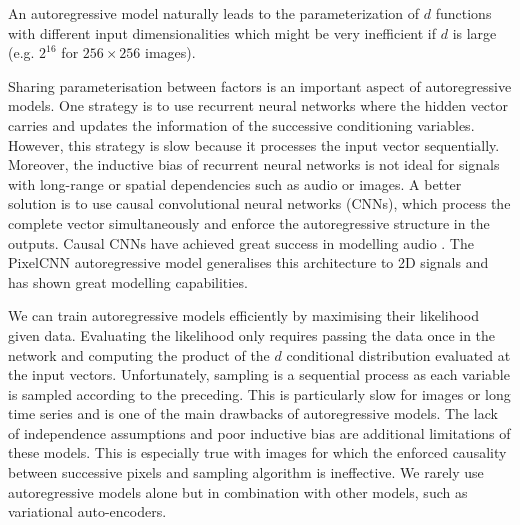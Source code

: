 An autoregressive model naturally leads to the parameterization of $d$ functions with different input dimensionalities which might be very inefficient if $d$ is large (e.g. $2^{16}$ for $256\times256$ images).

Sharing parameterisation between factors is an important aspect of autoregressive models. One strategy is to use recurrent neural networks where the hidden vector carries and updates the information of the successive conditioning variables\citep{van2016pixel}. However, this strategy is slow because it processes the input vector sequentially. Moreover, the inductive bias of recurrent neural networks is not ideal for signals with long-range or spatial dependencies such as audio or images. A better solution is to use causal convolutional neural networks (CNNs), which process the complete vector simultaneously and enforce the autoregressive structure in the outputs. Causal CNNs have achieved great success in modelling audio \citep{van_den_oord_wavenet_2016, van_den_oord_parallel_2018}. The PixelCNN autoregressive model generalises this architecture to 2D signals and has shown great modelling capabilities\citep{oord_conditional_2016}.

We can train autoregressive models efficiently by maximising their likelihood given data. Evaluating the likelihood only requires passing the data once in the network and computing the product of the $d$ conditional distribution evaluated at the input vectors. Unfortunately, sampling is a sequential process as each variable is sampled according to the preceding. This is particularly slow for images or long time series and is one of the main drawbacks of autoregressive models. The lack of independence assumptions and poor inductive bias are additional limitations of these models. This is especially true with images for which the enforced causality between successive pixels and sampling algorithm is ineffective. We rarely use autoregressive models alone but in combination with other models, such as variational auto-encoders.

